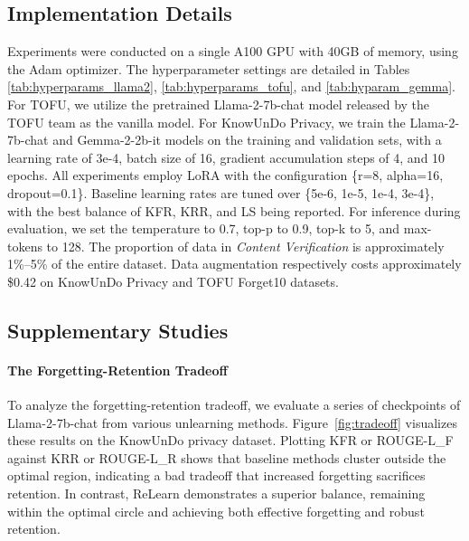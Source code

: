 \subsection{Implementation Details}
\label{appendix:implementation}
Experiments were conducted on a single A100 GPU with 40GB of memory, using the Adam optimizer. 
The hyperparameter settings are detailed in Tables \ref{tab:hyperparams_llama2}, \ref{tab:hyperparams_tofu}, and \ref{tab:hyparam_gemma}.  
For TOFU, we utilize the pretrained Llama-2-7b-chat model released by the TOFU team as the vanilla model. 
For KnowUnDo Privacy, we train the Llama-2-7b-chat and Gemma-2-2b-it models on the training and validation sets, with a learning rate of 3e-4, batch size of 16, gradient accumulation steps of 4, and 10 epochs. 
All experiments employ LoRA with the configuration \{r=8, alpha=16, dropout=0.1\}. 
Baseline learning rates are tuned over \{5e-6, 1e-5, 1e-4, 3e-4\}, with the best balance of KFR, KRR, and LS being reported. 
For inference during evaluation, we set the temperature to 0.7, top-p to 0.9, top-k to 5, and max-tokens to 128.
The proportion of data in \textit{Content Verification} is approximately 1\%–5\% of the entire dataset. 
Data augmentation respectively costs approximately \$0.42 on KnowUnDo Privacy and TOFU Forget10 datasets. 

\subsection{Supplementary Studies}
\label{appendix:supplemetary_studies}
\paragraph{The Forgetting-Retention Tradeoff}
To analyze the forgetting-retention tradeoff, we evaluate a series of checkpoints of Llama-2-7b-chat from various unlearning methods.
Figure~\ref{fig:tradeoff} visualizes these results on the KnowUnDo privacy dataset.
Plotting KFR or ROUGE-L\_F against KRR or ROUGE-L\_R shows that baseline methods cluster outside the optimal region, indicating a bad tradeoff that increased forgetting sacrifices retention.
In contrast, ReLearn demonstrates a superior balance, remaining within the optimal circle and achieving both effective forgetting and robust retention.

